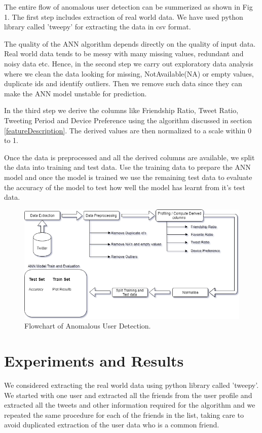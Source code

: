 \documentclass[conference]{IEEEtran}
\begin{document}
The entire flow of anomalous user detection can be summerized as shown in Fig 1. The first step includes extraction of real world data. 
We have used python library called 'tweepy' for extracting the data in csv format.

The quality of the ANN algorithm depends directly on the quality of input data. Real world data tends to be messy with many missing values, 
redundant and noisy data etc. Hence, in the second step we carry out exploratory data analysis where we clean the data looking for missing, 
NotAvailable(NA) or empty values, duplicate ids and identify outliers. Then we remove such data since they can make the ANN model unstable for prediction.

In the third step we derive the columns like Friendship Ratio, Tweet Ratio, Tweeting Period and Device Preference using the algorithm discussed in section 
\ref{featureDescription}. The derived values are then normalized to a scale within 0 to 1.

Once the data is preprocessed and all the derived columns are available, we split the data into training and test data. 
Use the training data to prepare the ANN model and once the model is trained we use the remaining test data to evaluate the 
accuracy of the model to test how well the model has learnt from it's test data.

\begin{figure}[h!]
	\includegraphics[scale=0.7]{Methodology1}
	\caption{Flowchart of Anomalous User Detection.}
\end{figure}

\section{Experiments and Results}
	  We considered extracting the real world data using python library called 'tweepy'. We started with one user and extracted all the friends 
	  from the user profile and extracted all the tweets and other information required for the algorithm and we repeated the same procedure for each 
	  of the friends in the list, taking care to avoid duplicated extraction of the user data who is a common friend. 
	   
\end{document}
